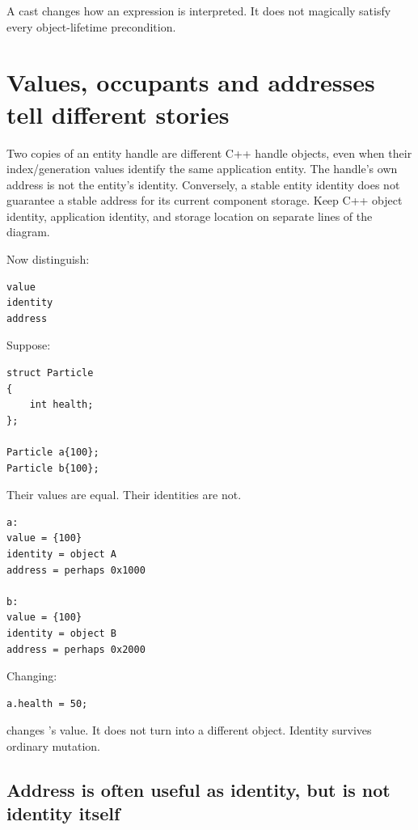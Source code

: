 A cast changes how an expression is interpreted. It does not magically satisfy every object-lifetime precondition.

\section{Values, occupants and addresses tell different stories}\label{05-engine-i-ch002-values-occupants-and-addresses-tell-different-stories}

\hypertarget{05-engine-i-ch002-values-occupants-and-addresses-tell-different-stories}{}

Two copies of an entity handle are different C++ handle objects, even when their index/generation values identify the same application entity. The handle's own address is not the entity's identity. Conversely, a stable entity identity does not guarantee a stable address for its current component storage. Keep C++ object identity, application identity, and storage location on separate lines of the diagram.

Now distinguish:

\begin{verbatim}
value
identity
address
\end{verbatim}

Suppose:

\begin{verbatim}
struct Particle
{
    int health;
};

Particle a{100};
Particle b{100};
\end{verbatim}

Their values are equal. Their identities are not.

\begin{verbatim}
a:
value = {100}
identity = object A
address = perhaps 0x1000

b:
value = {100}
identity = object B
address = perhaps 0x2000
\end{verbatim}

Changing:

\begin{verbatim}
a.health = 50;
\end{verbatim}

changes 's value. It does not turn  into a different object. Identity survives ordinary mutation.

\subsection{Address is often useful as identity, but is not identity itself}\label{05-engine-i-ch002-address-is-often-useful-as-identity-but-is-not-identity-itself}

